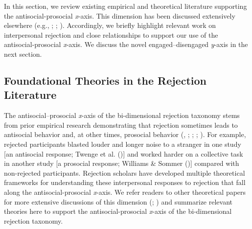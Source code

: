 \documentclass[
]{udthesis}
\begin{document}
In this section, we review existing empirical and theoretical literature
supporting the antisocial-prosocial \emph{x}-axis. This dimension has been
discussed extensively elsewhere (e.g., ; ; ). Accordingly, we briefly highlight relevant work on
interpersonal rejection and close relationships to support our use of
the antisocial-prosocial \emph{x}-axis. We discuss the novel
engaged--disengaged \emph{y}-axis in the next section.

\subsection{Foundational Theories in the Rejection Literature}\label{foundational-theories-in-the-rejection-literature}

The antisocial--prosocial \emph{x}-axis of the bi-dimensional rejection
taxonomy stems from prior empirical research demonstrating that
rejection sometimes leads to antisocial behavior and, at other times,
prosocial behavior (, ; ; ; ). For
example, rejected participants blasted louder and longer noise to a
stranger in one study {[}an antisocial response; Twenge et al. (){]} and worked
harder on a collective task in another study {[}a prosocial response;
Williams \& Sommer (){]} compared with non-rejected participants. Rejection
scholars have developed multiple theoretical frameworks for
understanding these interpersonal responses to rejection that fall along
the antisocial-prosocial \emph{x}-axis. We refer readers to other theoretical
papers for more extensive discussions of this dimension (; ) and summarize relevant theories here to support the
antisocial-prosocial \emph{x}-axis of the bi-dimensional rejection taxonomy.
\end{document}
